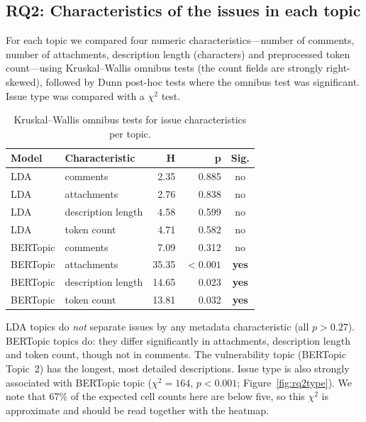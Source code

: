 \documentclass[11pt,a4paper]{report}
\begin{document}
\subsection{RQ2: Characteristics of the issues in each topic}
For each topic we compared four numeric characteristics---number of comments,
number of attachments, description length (characters) and preprocessed token
count---using Kruskal--Wallis omnibus tests (the count fields are strongly
right-skewed), followed by Dunn post-hoc tests where the omnibus test was
significant. Issue type was compared with a $\chi^2$ test.

\begin{table}[H]
  \centering
  \caption{Kruskal--Wallis omnibus tests for issue characteristics per topic.}
  \label{tab:rq2}
  \begin{tabular}{llrrc}
    \toprule
    \textbf{Model} & \textbf{Characteristic} & \textbf{H} & \textbf{p} & \textbf{Sig.}\\
    \midrule
    LDA      & comments           & 2.35  & 0.885    & no \\
    LDA      & attachments        & 2.76  & 0.838    & no \\
    LDA      & description length & 4.58  & 0.599    & no \\
    LDA      & token count        & 4.71  & 0.582    & no \\
    \midrule
    BERTopic & comments           & 7.09  & 0.312    & no \\
    BERTopic & attachments        & 35.35 & $<0.001$ & \textbf{yes} \\
    BERTopic & description length & 14.65 & 0.023    & \textbf{yes} \\
    BERTopic & token count        & 13.81 & 0.032    & \textbf{yes} \\
    \bottomrule
  \end{tabular}
\end{table}

LDA topics do \emph{not} separate issues by any metadata characteristic (all
$p>0.27$). BERTopic topics do: they differ significantly in attachments,
description length and token count, though not in comments. The vulnerability
topic (BERTopic Topic~2) has the longest, most detailed descriptions. Issue type
is also strongly associated with BERTopic topic ($\chi^2=164$, $p<0.001$;
Figure~\ref{fig:rq2type}). We note that $67\%$ of the expected cell counts here
are below five, so this $\chi^2$ is approximate and should be read together with
the heatmap.
\end{document}
